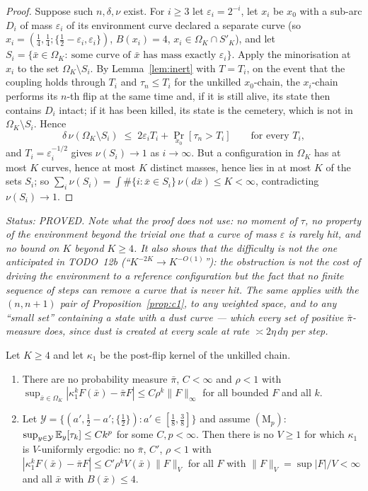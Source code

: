 \begin{proof}
Suppose such $n,\delta,\nu$ exist.  For $i\ge3$ let
$\varepsilon_i=2^{-i}$, let $x_i$ be $x_0$ with a sub-arc $D_i$ of mass
$\varepsilon_i$ of its environment curve declared a separate curve
(so $x_i=(\tfrac14,\tfrac14;\{\tfrac12-\varepsilon_i,\varepsilon_i\})$,
$B(x_i)=4$, $x_i\in\Omega_K\cap S'_K$), and let
$S_i=\{\bar x\in\Omega_K:\ \text{some curve of }\bar x\text{ has mass
exactly }\varepsilon_i\}$.  Apply the minorisation at $x_i$ to the set
$\Omega_K\setminus S_i$.  By Lemma~\ref{lem:inert} with $T=T_i$, on the
event that the coupling holds through $T_i$ and $\tau_n\le T_i$ for the
unkilled $x_0$-chain, the $x_i$-chain performs its $n$-th flip at the
same time and, if it is still alive, its state then contains $D_i$
intact; if it has been killed, its state is the cemetery, which is not
in $\Omega_K\setminus S_i$.  Hence
\[
\delta\,\nu(\Omega_K\setminus S_i)\;\le\;2\varepsilon_iT_i+\Pr_{x_0}[\tau_n>T_i]
\qquad\text{for every }T_i ,
\]
and $T_i=\varepsilon_i^{-1/2}$ gives $\nu(S_i)\to1$ as $i\to\infty$.
But a configuration in $\Omega_K$ has at most $K$ curves, hence at most
$K$ distinct masses, hence lies in at most $K$ of the sets $S_i$; so
$\sum_i\nu(S_i)=\int\#\{i:\bar x\in S_i\}\,\nu(d\bar x)\le K<\infty$,
contradicting $\nu(S_i)\to1$.
\end{proof}

\emph{Status: PROVED.  Note what the proof does not use: no moment of
$\tau$, no property of the environment beyond the trivial one that a
curve of mass $\varepsilon$ is rarely hit, and no bound on $K$ beyond
$K\ge4$.  It also shows that the difficulty is not the one anticipated
in TODO~12b (``$K^{-2K}\to K^{-O(1)}$''): the obstruction is not the
\emph{cost} of driving the environment to a reference configuration but
the fact that no finite sequence of steps can remove a curve that is
never hit.  The same applies with the $(n,n+1)$ pair of
Proposition~\ref{prop:c1}, to any weighted space, and to any
``small set'' containing a state with a dust curve --- which every set
of positive $\bar\pi$-measure does, since dust is created at every
scale at rate $\asymp2\eta\,d\eta$ per step.}

\begin{corollary}\label{cor:noerg}
Let $K\ge4$ and let $\kappa_1$ be the post-flip kernel of the unkilled
chain.
\begin{enumerate}[leftmargin=2em]
\item[(i)] There are no probability measure $\bar\pi$, $C<\infty$ and
$\rho<1$ with $\sup_{\bar x\in\Omega_K}|\kappa_1^kF(\bar x)-\bar\pi F|
\le C\rho^k\|F\|_\infty$ for all bounded $F$ and all $k$.
\item[(ii)] Let $\mathcal Y=\{(a',\tfrac12-a';\{\tfrac12\}):
a'\in[\tfrac18,\tfrac38]\}$ and assume
$(\mathrm M_p)$: $\sup_{y\in\mathcal Y}\mathbb{E}_y[\tau_k]\le Ck^p$ for some
$C,p<\infty$.  Then there is no $V\ge1$ for which $\kappa_1$ is
$V$-uniformly ergodic: no $\bar\pi$, $C'$, $\rho<1$ with
$|\kappa_1^kF(\bar x)-\bar\pi F|\le C'\rho^kV(\bar x)\|F\|_V$ for all
$F$ with $\|F\|_V=\sup|F|/V<\infty$ and all $\bar x$ with $B(\bar x)\le4$.
\end{enumerate}
\end{corollary}

